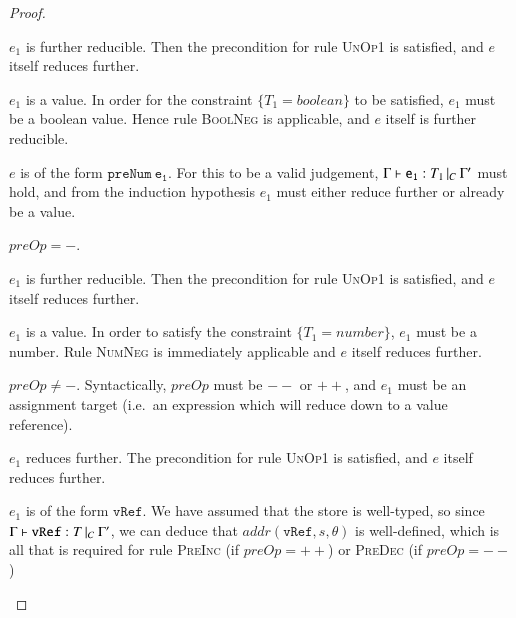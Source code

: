 \begin{proof}
\begin{case}[NegType]
	\begin{subcase}
	  $e_1$ is further reducible.
	  Then the precondition for rule \textsc{UnOp1}
	  is satisfied, and $e$ itself reduces further.
	\end{subcase}

	\begin{subcase}
	  $e_1$ is a value.
	  In order for the constraint $\{T_1=boolean\}$ to be
	  satisfied, $e_1$ must be a boolean value. Hence 
	  rule \textsc{BoolNeg} is applicable, and $e$ itself is further reducible.
	\end{subcase}
  \end{case}

  \begin{case}[PreNumType]\label{case:prog-prenumtype}

	$e$ is of the form $\mathtt{preNum\ e_1}$. For this to be a valid judgement,
	$\Gamma{}\vdash\mathtt{e_1}: T_1\,|_C\:\Gamma'$ must hold, and from the induction hypothesis $e_1$ must
	either reduce further or already be a value.

	\begin{subcase}
	  $preOp=-$. 

	  \begin{subcase}
	  	$e_1$ is further reducible.
	  	Then the precondition for rule \textsc{UnOp1}
	  	is satisfied, and $e$ itself reduces further.
	  \end{subcase}

	  \begin{subcase}
	  	$e_1$ is a value.
	  	In order to satisfy the constraint $\{T_1=number\}$,
	  	$e_1$ must be a number. Rule \textsc{NumNeg} is immediately applicable
	  	and $e$ itself reduces further.
	  \end{subcase}

	\end{subcase}

	\begin{subcase}
	  $preOp\neq-$. 
	  Syntactically, $preOp$ must be $\mathtt{--}$ or $\mathtt{++}$, and $e_1$
	  must be an assignment target (i.e.\ an expression which will reduce down
	  to a value reference).

	  \begin{subcase}
		$e_1$ reduces further. 
		The precondition for rule \textsc{UnOp1} is satisfied, and $e$ itself
		reduces further.
	  \end{subcase}

	  \begin{subcase}
		$e_1$ is of the form $\mathtt{vRef}$.
		We have assumed that the store is well-typed, so since
		$\Gamma{}\vdash\mathtt{vRef}: T\,|_C\:\Gamma'$, we can deduce that $addr(\mathtt{vRef}, s, \theta)$
		is well-defined, which is all that is required for rule \textsc{PreInc}
		(if $preOp = ++$) or \textsc{PreDec} (if $preOp=--$)
	  \end{subcase}


\end{subcase}
\end{case}
\end{proof}
